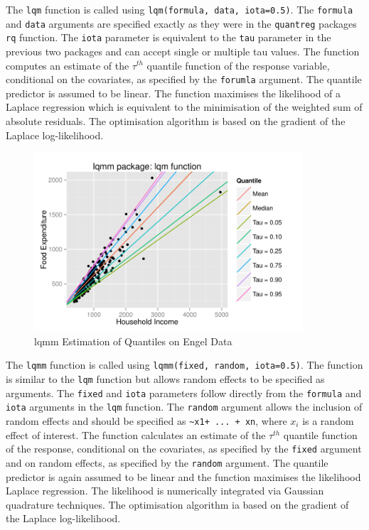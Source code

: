 \documentclass[12pt,a4paper]{report}
\begin{document}
The {\small\verb"lqm"} function is called using {\small\verb"lqm(formula, data, iota=0.5)"}. The {\small\verb"formula"} and {\small\verb"data"} arguments are specified exactly as they were in the {\small\verb"quantreg"} packages {\small\verb"rq"} function. The {\small\verb"iota"} parameter is equivalent to the {\small\verb"tau"} parameter in the previous two packages and can accept single or multiple tau values. The function computes an estimate of the $\tau^{th}$ quantile function of the response variable, conditional on the covariates, as specified by the {\small\verb"forumla"} argument. The quantile predictor is assumed to be linear. The function maximises the likelihood of a Laplace regression which is equivalent to the minimisation of the weighted sum of absolute residuals. The optimisation algorithm is based on the gradient of the Laplace log-likelihood.
\vspace{2mm}

\begin{figure}[ht]\centering
    \includegraphics[width=10cm]{PlotofLqmm.pdf}
    \caption{lqmm Estimation of Quantiles on Engel Data}
    \label{plot:lqmm-example}
\end{figure}

The {\small\verb"lqmm"} function is called using {\small\verb"lqmm(fixed, random, iota=0.5)"}. The function is similar to the {\small\verb"lqm"} function but allows random effects to be specified as arguments. The {\small\verb"fixed"} and {\small\verb"iota"} parameters follow directly from the {\small\verb"formula"} and {\small\verb"iota"} arguments in the {\small\verb"lqm"} function. The {\small\verb"random"} argument allows the inclusion of random effects and should be specified as {\small\verb"~x1+ ... + xn"}, where $x_{i}$ is a random effect of interest. The function calculates an estimate of the $\tau^{th}$ quantile function of the response, conditional on the covariates, as specified by the {\small\verb"fixed"} argument and on random effects, as specified by the {\small\verb"random"} argument. The quantile predictor is again assumed to be linear and the function maximises the likelihood Laplace regression. The likelihood is numerically integrated via Gaussian quadrature techniques. The optimisation algorithm ia based on the gradient of the Laplace log-likelihood.
\vspace{2mm}
\end{document}
